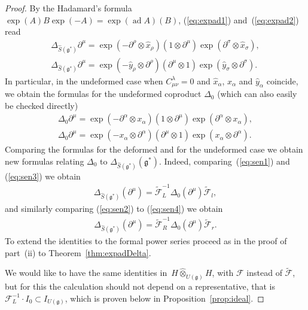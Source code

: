 \documentclass[10pt,a4paper]{amsart}
\def\gg{\mathfrak{g}}
\def\hx{\hat{x}}
\def\hy{\hat{y}}
\def\ad{\operatorname{ad}}
\numberwithin{equation}{section}
\begin{document}
\begin{proof}
By the Hadamard's formula $\exp(A)B\exp(-A) = \exp(\ad A)(B)$, (\ref{eq:expad1}) and~(\ref{eq:expad2}) read
\begin{gather}\label{eq:sen1}
\Delta_{\hat{S}(\gg^*)}\partial^\mu = \exp(-\partial^\rho \otimes\hx_\rho)(1\otimes\partial^\mu)\exp(\partial^\sigma\otimes\hx_\sigma),\\
\label{eq:sen2}
\Delta_{\hat{S}(\gg^*)}\partial^\mu = \exp(-\hy_\rho\otimes\partial^\rho)(\partial^\mu\otimes 1)\exp(\hy_\sigma\otimes\partial^\sigma).
\end{gather}
In particular, in the undeformed case when $C_{\mu\nu}^\lambda = 0$ and $\hx_\alpha$, $x_\alpha$ and $\hy_\alpha$ coincide, we obtain the formulas for the undeformed coproduct $\Delta_0$ (which can also easily be checked directly)
\begin{gather}\label{eq:sen3}
\Delta_0\partial^\mu = \exp(-\partial^\alpha\otimes x_\alpha)(1\otimes\partial^\mu)\exp(\partial^\alpha\otimes x_\alpha),\\
\label{eq:sen4}
\Delta_0\partial^\mu = \exp(-x_\alpha\otimes\partial^\alpha)
(\partial^\mu\otimes 1)\exp(x_\alpha\otimes\partial^\alpha).
\end{gather}
Comparing the formulas for the deformed and for the undeformed case we obtain new formulas relating $\Delta_0$ to $\Delta_{\hat{S}(\gg^*)}(\gg^*)$. Indeed, comparing~(\ref{eq:sen1}) and (\ref{eq:sen3}) we obtain
\begin{gather*}%
\Delta_{\hat{S}(\gg^*)}(\partial^\mu) = \tilde{\mathcal{F}}^{-1}_L\Delta_0(\partial^\mu)\tilde{\mathcal{F}}_l,
\end{gather*}
and similarly comparing (\ref{eq:sen2}) to (\ref{eq:sen4}) we obtain
\begin{gather*}%
\Delta_{\hat{S}(\gg^*)}(\partial^\mu) = \tilde{\mathcal{F}}^{-1}_R\Delta_0(\partial^\mu)\tilde{\mathcal{F}}_r.
\end{gather*}
To extend the identities to the formal power series proceed as in the proof of part~(ii) to Theorem~\ref{thm:expadDelta}.

We would like to have the same identities in~$H\hat\otimes_{U(\gg)}H$, with $\mathcal{F}$ instead of $\tilde{\mathcal{F}}$, but for this the calculation should not depend on a representative, that is $\mathcal{F}^{-1}_L\cdot I_0 \subset I_{U(\gg)}$, which is proven below in Proposition~\ref{prop:ideal}.
\end{proof}
\end{document}
